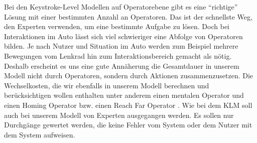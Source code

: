 Bei den Keystroke-Level Modellen auf Operatorebene gibt es eine "`richtige"' Lösung mit einer bestimmten Anzahl an Operatoren. 
Das ist der schnellste Weg, den Experten verwenden, um eine bestimmte Aufgabe zu lösen. 
Doch bei Interaktionen im Auto lässt sich viel schwieriger eine Abfolge von Operatoren bilden. 
Je nach Nutzer und Situation im Auto werden zum Beispiel mehrere Bewegungen vom Lenkrad hin zum Interaktionsbereich gemacht als nötig. 
Deshalb erscheint es uns eine gute Annäherung die Gesamtdauer in unserem Modell nicht durch Operatoren, sondern durch Aktionen zusammenzusetzen. 
Die Wechselkosten, die wir ebenfalls in unserem Modell berechnen und berücksichtigen wollen enthalten unter anderem einen mentalen Operator und einen Homing Operator \citep{Card_1980} bzw. einen Reach Far Operator \citep{Green_2002}. 
Wie bei dem KLM soll auch bei unserem Modell von Experten ausgegangen werden. 
Es sollen nur Durchgänge gewertet werden, die keine Fehler vom System oder dem Nutzer mit dem System aufweisen.